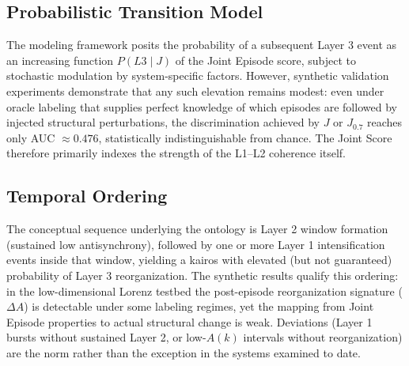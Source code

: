 \subsection{Probabilistic Transition Model}

The modeling framework posits the probability of a subsequent Layer 3 event as an increasing function $P(L3 \mid J)$ of the Joint Episode score, subject to stochastic modulation by system-specific factors. However, synthetic validation experiments demonstrate that any such elevation remains modest: even under oracle labeling that supplies perfect knowledge of which episodes are followed by injected structural perturbations, the discrimination achieved by $J$ or $J_{0.7}$ reaches only AUC $\approx 0.476$, statistically indistinguishable from chance. The Joint Score therefore primarily indexes the strength of the L1--L2 coherence itself.

\subsection{Temporal Ordering}

The conceptual sequence underlying the ontology is Layer 2 window formation (sustained low antisynchrony), followed by one or more Layer 1 intensification events inside that window, yielding a kairos with elevated (but not guaranteed) probability of Layer 3 reorganization. The synthetic results qualify this ordering: in the low-dimensional Lorenz testbed the post-episode reorganization signature ($\Delta A$) is detectable under some labeling regimes, yet the mapping from Joint Episode properties to actual structural change is weak. Deviations (Layer 1 bursts without sustained Layer 2, or low-$A(k)$ intervals without reorganization) are the norm rather than the exception in the systems examined to date.
